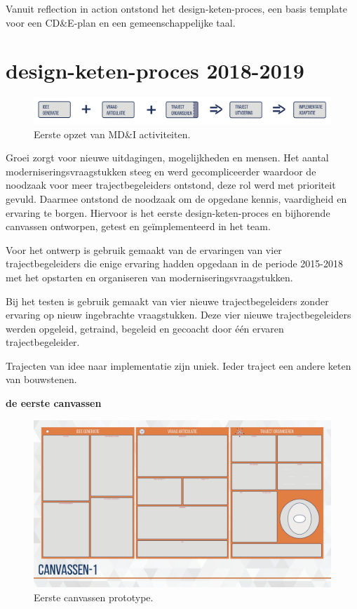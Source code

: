 \documentclass[
]{book}
\begin{document}
Vanuit reflection in action ontstond het design-keten-proces, een basis template voor een CD\&E-plan en een gemeenschappelijke taal.

\hypertarget{design-keten-proces-2018-2019}{%
\section{design-keten-proces 2018-2019}\label{design-keten-proces-2018-2019}}

\begin{figure}

{\centering \includegraphics[width=0.5\linewidth]{data/images/20190710-CDE-designproces_bouwstenenKeten} 

}

\caption{Eerste opzet van MD\&I activiteiten.}\label{fig:unnamed-chunk-17}
\end{figure}

Groei zorgt voor nieuwe uitdagingen, mogelijkheden en mensen. Het aantal moderniseringsvraagstukken steeg en werd gecompliceerder waardoor de noodzaak voor meer trajectbegeleiders ontstond, deze rol werd met prioriteit gevuld. Daarmee ontstond de noodzaak om de opgedane kennis, vaardigheid en ervaring te borgen. Hiervoor is het eerste design-keten-proces en bijhorende canvassen ontworpen, getest en geïmplementeerd in het team.

Voor het ontwerp is gebruik gemaakt van de ervaringen van vier trajectbegeleiders die enige ervaring hadden opgedaan in de periode 2015-2018 met het opstarten en organiseren van moderniseringsvraagstukken.

Bij het testen is gebruik gemaakt van vier nieuwe trajectbegeleiders zonder ervaring op nieuw ingebrachte vraagstukken. Deze vier nieuwe trajectbegeleiders werden opgeleid, getraind, begeleid en gecoacht door één ervaren trajectbegeleider.

Trajecten van idee naar implementatie zijn uniek.
Ieder traject een andere keten van bouwstenen.

\textbf{de eerste canvassen}

\begin{figure}

{\centering \includegraphics[width=0.5\linewidth]{data/keynote-slides/20200430-CDE-Designprocess/20200430-CDE-Designprocess.023} 

}

\caption{Eerste canvassen prototype.}\label{fig:unnamed-chunk-18}
\end{figure}
\end{document}
